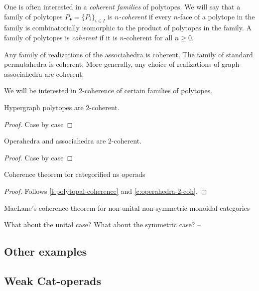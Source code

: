 One is often interested in a \emph{coherent families} of polytopes. 
We will say that a family of polytopes $P_\bullet = \{P_i\}_{i \in I}$ is \emph{$n$-coherent} if every $n$-face of a polytope in the family is combinatorially isomorphic to the product of polytopes in the family. 
A family of polytopes is \emph{coherent} if it is $n$-coherent for all $n \geq 0$.

\begin{example}
    Any family of realizations of the associahedra is coherent. 
    The family of standard permutahedra is coherent. 
    More generally, any choice of realizations of graph-associahedra are coherent. 
\end{example}

We will be interested in $2$-coherence of certain families of polytopes. 

\begin{proposition}
    Hypergraph polytopes are $2$-coherent. 
\end{proposition}

\begin{proof}
    Case by case
\end{proof}

\begin{corollary}
    \label{c:operahedra-2-coh}
    Operahedra and associahedra are $2$-coherent.
\end{corollary}

\begin{proof}
    Case by case
\end{proof}

\begin{thm}
    Coherence theorem for categorified ns operads
\end{thm}

\begin{proof}
    Follows \cref{t:polytopal-coherence} and \cref{c:operahedra-2-coh}.
\end{proof}

\begin{corollary}
    MacLane's coherence theorem for non-unital non-symmetric monoidal categories
\end{corollary}

\begin{rem}
    What about the unital case? 
    What about the symmetric case? --
\end{rem}


\subsection{Other examples}

\subsection{Weak Cat-operads}


